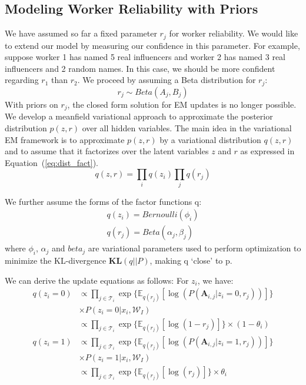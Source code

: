 \documentclass{article}
\begin{document}
\subsection{Modeling Worker Reliability with Priors}
We have assumed so far a fixed parameter $r_j$ for worker reliability. 
We would like to extend our model by measuring our confidence in this parameter.
For example, suppose worker 1 has named 5 real influencers and worker 2 has named 
3 real influencers and 2 random names. In this case, we should be more confident
regarding $r_1$ than $r_2$. We proceed by assuming a Beta distribution for $r_j$:
\begin{equation}
		r_j \sim Beta(A_j,B_j)
		\label{eq:rj_dist}
\end{equation}
With priors on $r_j$, the closed form solution  for EM updates is no longer possible.
We develop a meanfield variational approach to approximate the posterior distribution 
$p(z,r)$ over all hidden variables. 
The main idea in the variational EM framework \cite{bayes2008variational} is to approximate $p(z,r)$ 
by a variational distribution $q(z,r)$ and to assume that it factorizes over
the latent variables $z$ and $r$ as expressed in Equation~(\ref{eq:dist_fact}).
\begin{equation}
	q(z,r)=\prod_{i} q(z_i) \prod_j q(r_j)
	\label{eq:dist_fact}
\end{equation}

We further assume the forms of the factor functions q:
\begin{align}
	q(z_i)=Bernoulli(\phi_i) \\
	q(r_j)=Beta(\alpha_j,\beta_j)
\end{align}
where $\phi_i$, $\alpha_j$ and $beta_j$ are variational parameters
used to perform optimization to minimize the KL-divergence $\mathbf{KL}(q||P)$, 
making q ‘close’ to p.

We can derive the update equations as follows:
For $z_i$, we have:
\begin{align}
    q(z_i=0)    &\propto \prod_{j \in \mathcal{T}_{i}} \exp{\{\mathbb{E}_{q(r_j)}[\log (P(\mathbf{A}_{i,j}|z_i=0,r_j))]\}}				\nonumber \\ &\times P(z_i=0|x_i, \mathcal{W}_I)  \nonumber \\
                &\propto \prod_{j \in \mathcal{T}_{i}} \exp{\{\mathbb{E}_{q(r_j)}[\log (1-r_j)]\}}\times (1-\theta_i) \nonumber \\
    q(z_i=1)    &\propto \prod_{j \in \mathcal{T}_{i}} \exp{\{\mathbb{E}_{q(r_j)}[\log (P(\mathbf{A}_{i,j}|z_i=1,r_j))]\}}\nonumber \\ &\times P(z_i=1|x_i, \mathcal{W}_I)   \nonumber \\
                &\propto \prod_{j \in \mathcal{T}_{i}} \exp{\{\mathbb{E}_{q(r_j)}[\log (r_j)]\}}\times \theta_i 
\label{eq:q_two_poss}                
\end{align}
\end{document}
